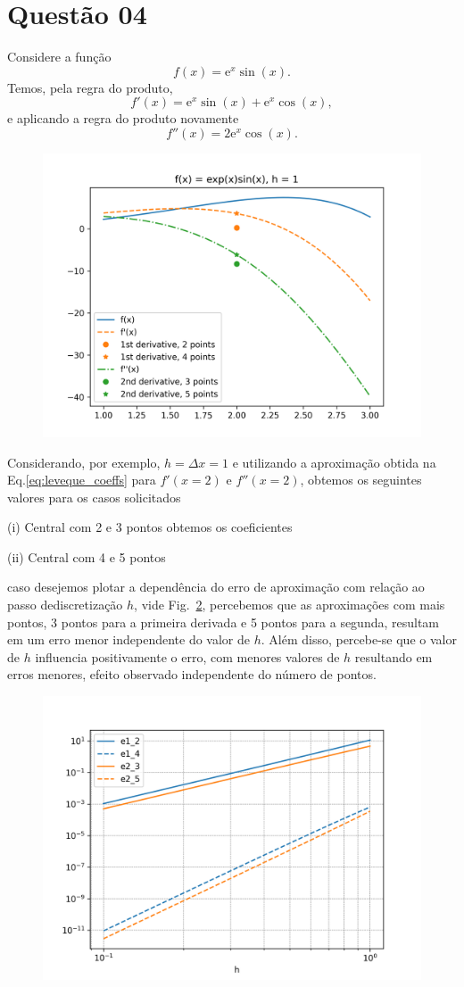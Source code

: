 \documentclass{article}
\newcommand{\euler}{\mathrm{e}}
\begin{document}
\section{Questão 04}
Considere a função 
\[ f(x) = \euler^x \sin(x).
\]
Temos, pela regra do produto, 
\[ f'(x) = \euler^x \sin(x) + \euler^x\cos(x),
\]
e aplicando a regra do produto novamente
\[ f''(x) =  2\euler^x\cos(x).
\]

\begin{figure}[h]
\centering
  \includegraphics[width=.8\textwidth]{q4.png}
  \label{fig:q4}
\end{figure}
Considerando, por exemplo, $h=\Delta x = 1$ e
utilizando a aproximação obtida na Eq.\eqref{eq:leveque_coeffs} para $f'(x=2)$
e $f''(x=2)$, obtemos os seguintes valores para os casos solicitados

(i) Central com 2 e 3 pontos
obtemos os coeficientes 


(ii) Central com 4 e 5 pontos

caso desejemos plotar a dependência do erro de aproximação com relação ao passo dediscretização $h$, vide Fig.~\ref{fig:q4_error}, percebemos que as aproximações com mais pontos, 3 pontos para a primeira derivada e 5 pontos para a segunda, resultam em um erro menor independente do valor de $h$. Além disso, percebe-se que o valor de $h$ influencia positivamente o erro, com menores valores de $h$ resultando em erros menores, efeito observado independente do número de pontos.
\begin{figure}[h]
  \centering
  \includegraphics[width=.8\textwidth]{q4_error.png}
  \label{fig:q4_error}
\end{figure}
\end{document}
